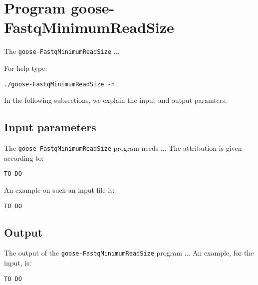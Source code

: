 \section{Program goose-FastqMinimumReadSize}
The \texttt{goose-FastqMinimumReadSize} ...

For help type:
\begin{lstlisting}
./goose-FastqMinimumReadSize -h
\end{lstlisting}
In the following subsections, we explain the input and output paramters.

\subsection*{Input parameters}

The \texttt{goose-FastqMinimumReadSize} program needs ...
The attribution is given according to:
\begin{lstlisting}
TO DO
\end{lstlisting}

An example on such an input file is:
\begin{lstlisting}
TO DO
\end{lstlisting}

\subsection*{Output}
The output of the \texttt{goose-FastqMinimumReadSize} program ...
An example, for the input, is:
\begin{lstlisting}
TO DO
\end{lstlisting}
